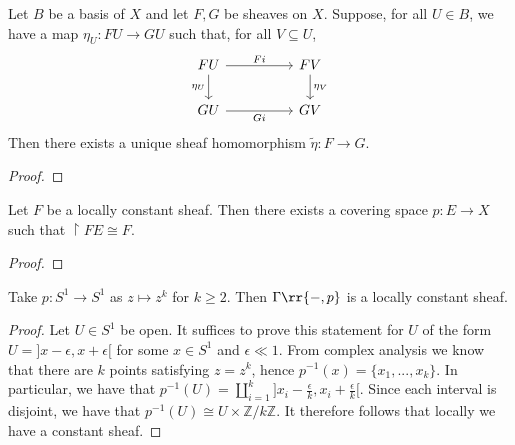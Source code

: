 \documentclass{article}
\begin{document}
\begin{lemma}
  Let $B$ be a basis of $X$ and let $F,G$ be sheaves on $X$. Suppose, for all $U\in B$,
  we have a map $\eta_U:FU\to GU$ such that, for all $V\subseteq U$,
  \begin{equation}
    \begin{tikzcd}
      FU && FV \\
      GU && GV
      \arrow["Fi", from=1-1, to=1-3]
      \arrow["{\eta_U}"', from=1-1, to=2-1]
      \arrow["{\eta_V}", from=1-3, to=2-3]
      \arrow["Gi"', from=2-1, to=2-3]
    \end{tikzcd}
  \end{equation}
  Then there exists a unique sheaf homomorphism $\tilde\eta : F\to G$.
  \begin{proof}
    \missingproof
  \end{proof}
\end{lemma}

\begin{theorem}
  Let $F$ be a locally constant sheaf. Then there exists a covering space
  $p:E\to X$ such that $\restriction{F}{E} \cong F$.
  \begin{proof}
    \missingproof
  \end{proof}
\end{theorem}

\begin{example}
  Take $p:S^1 \to S^1$ as $z\mapsto z^k$ for $k\geq 2$.
  Then $\Gamma\rr{-,p}$ is a locally constant sheaf.
  \begin{proof}
    Let $U \in S^1$ be open. It suffices to prove this statement for $U$ of the form $U = ]x - \epsilon, x + \epsilon[$ for some $x \in S^1$ and $\epsilon \ll 1$. From complex analysis we know that there are $k$ points satisfying $z = z^k$, hence $p^{-1}(x) = \{x_1, ..., x_k\}$. In particular, we have that $p^{-1}(U) = \amalg_{i=1}^k ]x_i - \frac{\epsilon}{k}, x_i + \frac{\epsilon}{k}[$. Since each interval is disjoint, we have that $p^{-1}(U) \cong U \times \mathbb{Z}/k\mathbb{Z}$. It therefore follows that locally we have a constant sheaf.
    \missingproof
  \end{proof}
\end{example}
\end{document}
